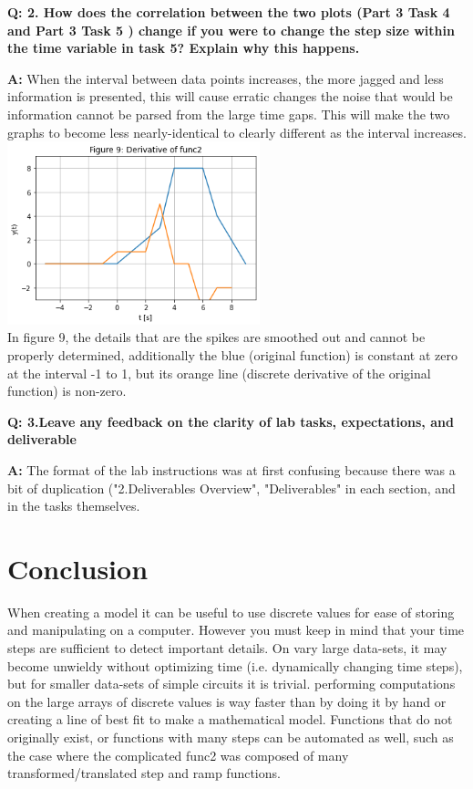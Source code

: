 \documentclass[12pt,a4paper]{article}
\newcommand{\Q}{\bigskip\bfseries Q: }
\newcommand{\A}{\par\textbf{A:} \normalfont}
\begin{document}
\Q 2. How does the correlation between the two plots (Part 3 Task 4 and Part 3 Task 5 ) change if you were to change the step size within the time variable in task 5? Explain why this happens.
\A2 When the interval between data points increases, the more jagged and less information is presented, this will cause erratic changes the noise that would be information cannot be parsed from the large time gaps.  This will make the two graphs to become less nearly-identical to clearly different as the interval increases.
\\\includegraphics[width=0.55\textwidth]{Figure9.png}\\
In figure 9, the details that are the spikes are smoothed out and cannot be properly determined, additionally the blue (original function) is constant at zero at the interval -1 to 1, but its orange line (discrete derivative of the original function) is non-zero.

\Q 3.Leave any feedback on the clarity of lab tasks, expectations, and deliverable
\A The format of the lab instructions was at first confusing  because there was a bit of duplication ("2.Deliverables Overview", "Deliverables" in each section, and in the tasks themselves.


\section{Conclusion}\label{sec:res}
When creating a model it can be useful to use discrete values for ease of storing and manipulating on a computer.  However you must keep in mind that your time steps are sufficient to detect important details.  On vary large data-sets, it may become unwieldy without optimizing time (i.e. dynamically changing time steps), but for smaller data-sets of simple circuits it is trivial. performing computations on the large arrays of discrete values is way faster than by doing it by hand or creating a line of best fit to make a mathematical model.
Functions that do not originally exist, or functions with many steps can be automated as well, such as the case where the complicated func2 was composed of many transformed/translated step and ramp functions.




\end{document}
